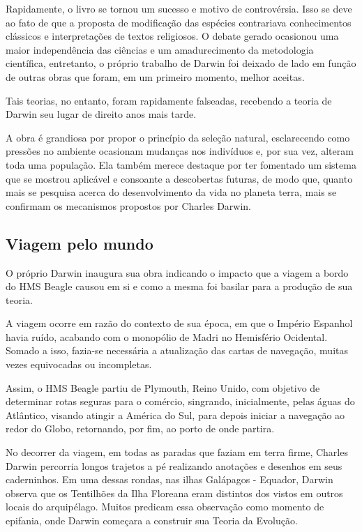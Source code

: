 \documentclass[12pt]{extarticle}
\begin{document}
Rapidamente, o livro se tornou um sucesso e motivo de controvérsia. Isso se
deve ao fato de que a proposta de modificação das espécies contrariava
conhecimentos clássicos e interpretações de textos religiosos. O debate gerado
ocasionou uma maior independência das ciências e um amadurecimento da
metodologia científica, entretanto, o próprio trabalho de Darwin foi deixado de
lado em função de outras obras que foram, em um primeiro momento, melhor
aceitas.

Tais teorias, no entanto, foram rapidamente falseadas, recebendo a teoria de
Darwin seu lugar de direito anos mais tarde.

A obra é grandiosa por propor o princípio da seleção natural, esclarecendo como
pressões no ambiente ocasionam mudanças nos indivíduos e, por sua vez, alteram
toda uma população. Ela também merece destaque por ter fomentado um sistema que
se mostrou aplicável e consoante a descobertas futuras, de modo que, quanto
mais se pesquisa acerca do desenvolvimento da vida no planeta terra, mais se
confirmam os mecanismos propostos por Charles Darwin.


\subsection{Viagem pelo mundo}

O próprio Darwin inaugura sua obra indicando o impacto que a viagem a bordo do
HMS Beagle causou em si e como a mesma foi basilar para a produção de sua
teoria.




A viagem ocorre em razão do contexto de sua época, em que o Império Espanhol
havia ruído, acabando com o monopólio de Madri no Hemisfério Ocidental. Somado
a isso, fazia-se necessária a atualização das cartas de navegação, muitas vezes
equivocadas ou incompletas.

Assim, o HMS Beagle partiu de Plymouth, Reino Unido, com objetivo de determinar
rotas seguras para o comércio, singrando, inicialmente, pelas águas do
Atlântico, visando atingir a América do Sul, para depois iniciar a navegação ao
redor do Globo, retornando, por fim, ao porto de onde partira.




No decorrer da viagem, em todas as paradas que faziam em terra firme, Charles
Darwin percorria longos trajetos a pé realizando anotações e desenhos em seus
caderninhos. Em uma dessas rondas, nas ilhas Galápagos - Equador, Darwin
observa que os Tentilhões da Ilha Floreana eram distintos dos vistos em outros
locais do arquipélago. Muitos predicam essa observação como momento de
epifania, onde Darwin começara a construir sua Teoria da Evolução.
\end{document}
